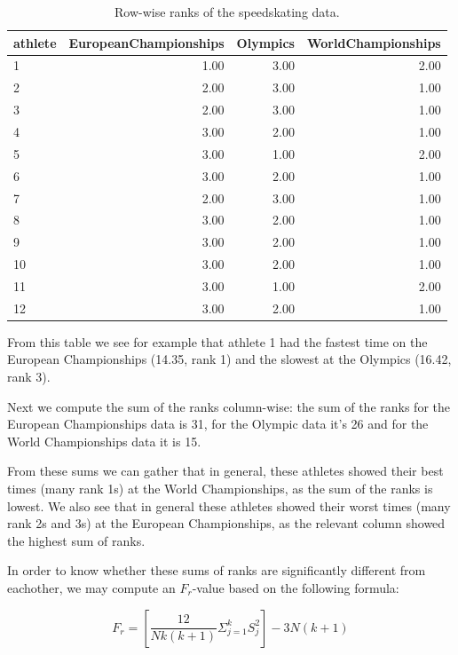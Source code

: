 \documentclass[]{report}\usepackage[]{graphicx}\usepackage[]{color}
\begin{document}
\begin{table}[ht]
\centering
\caption{Row-wise ranks of the speedskating data.} 
\label{tab:nonparmixed_5}
\begin{tabular}{lrrr}
  \hline
athlete & EuropeanChampionships & Olympics & WorldChampionships \\ 
  \hline
1 & 1.00 & 3.00 & 2.00 \\ 
  2 & 2.00 & 3.00 & 1.00 \\ 
  3 & 2.00 & 3.00 & 1.00 \\ 
  4 & 3.00 & 2.00 & 1.00 \\ 
  5 & 3.00 & 1.00 & 2.00 \\ 
  6 & 3.00 & 2.00 & 1.00 \\ 
  7 & 2.00 & 3.00 & 1.00 \\ 
  8 & 3.00 & 2.00 & 1.00 \\ 
  9 & 3.00 & 2.00 & 1.00 \\ 
  10 & 3.00 & 2.00 & 1.00 \\ 
  11 & 3.00 & 1.00 & 2.00 \\ 
  12 & 3.00 & 2.00 & 1.00 \\ 
   \hline
\end{tabular}
\end{table}


From this table we see for example that athlete 1 had the fastest time on the European Championships (14.35, rank 1) and the slowest at the Olympics (16.42, rank 3).


Next we compute the sum of the ranks column-wise: the sum of the ranks for the European Championships data is 31, for the Olympic data it's 26 and for the World Championships data it is 15.

From these sums we can gather that in general, these athletes showed their best times (many rank 1s) at the World Championships, as the sum of the ranks is lowest. We also see that in general these athletes showed their worst times (many rank 2s and 3s) at the European Championships, as the relevant column showed the highest sum of ranks.

In order to know whether these sums of ranks are significantly different from eachother, we may compute an $F_r$-value based on the following formula:


\begin{equation}
F_r = \left[  \frac{12}{Nk(k+1)} \Sigma^k_{j=1} S_j^2      \right] - 3N (k+1)
\end{equation}
\end{document}
